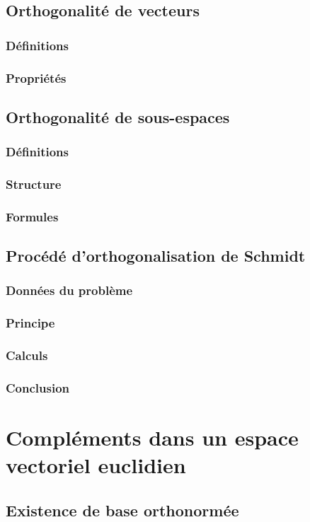 \documentclass[12pt,a4paper,french]{book}
\begin{document}
		\subsection{Orthogonalité de vecteurs}
			\subsubsection{Définitions}
			\subsubsection{Propriétés}
		\subsection{Orthogonalité de sous-espaces}
			\subsubsection{Définitions}
			\subsubsection{Structure}
			\subsubsection{Formules}
		\subsection{Procédé d'orthogonalisation de Schmidt}
			\subsubsection{Données du problème}
			\subsubsection{Principe}
			\subsubsection{Calculs}
			\subsubsection{Conclusion}
	\section{Compléments dans un espace vectoriel euclidien}
		\subsection{Existence de base orthonormée}
\end{document}
